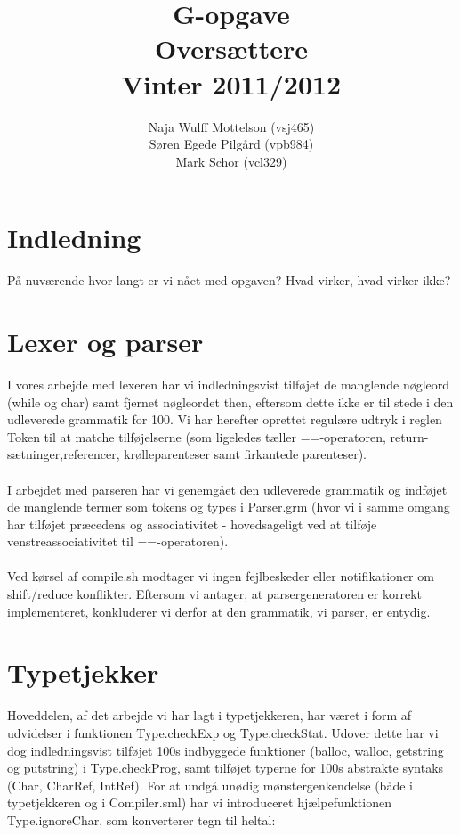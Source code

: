 \documentclass[10pt,a4paper,danish]{article}
\title{G-opgave \\Oversættere\\Vinter 2011/2012}
\author{Naja Wulff Mottelson (vsj465) \\
        Søren Egede Pilgård (vpb984) \\
        Mark Schor (vcl329)}
\begin{document}
\maketitle
\newpage

\tableofcontents
\newpage

\section{Indledning}
På nuværende hvor langt er vi nået med opgaven? Hvad virker, hvad virker ikke?

\section{Lexer og parser}
I vores arbejde med lexeren har vi indledningsvist tilføjet de manglende
nøgleord (while og char) samt fjernet nøgleordet then, eftersom
dette ikke er til stede i den udleverede 
grammatik for 100. Vi har herefter oprettet
regulære udtryk i reglen Token  til at matche tilføjelserne (som ligeledes
tæller ==-operatoren, return-sætninger,referencer, krølleparenteser samt
firkantede parenteser). 

\paragraph{}
I arbejdet med parseren har vi genemgået den udleverede grammatik 
og indføjet de manglende termer som tokens og types i Parser.grm
(hvor vi i samme omgang har tilføjet præcedens og associativitet - 
hovedsageligt ved at tilføje venstreassociativitet 
til ==-operatoren).

\paragraph{}
Ved kørsel af compile.sh modtager vi ingen fejlbeskeder eller 
notifikationer om shift/reduce konflikter. Eftersom vi antager, at 
parsergeneratoren er korrekt implementeret, konkluderer vi derfor at den 
grammatik, vi parser, er entydig. 

\section{Typetjekker}
Hoveddelen, af det arbejde vi har lagt i typetjekkeren, har været i form
af udvidelser i funktionen Type.checkExp og Type.checkStat.
Udover dette har vi dog indledningsvist tilføjet 100s indbyggede
funktioner (balloc, walloc, getstring og putstring) i Type.checkProg, samt 
tilføjet typerne for 100s abstrakte syntaks (Char, CharRef, IntRef).
For at undgå unødig mønstergenkendelse (både i typetjekkeren og 
i Compiler.sml) har vi introduceret hjælpefunktionen Type.ignoreChar, 
som konverterer tegn til heltal: 
\end{document}
